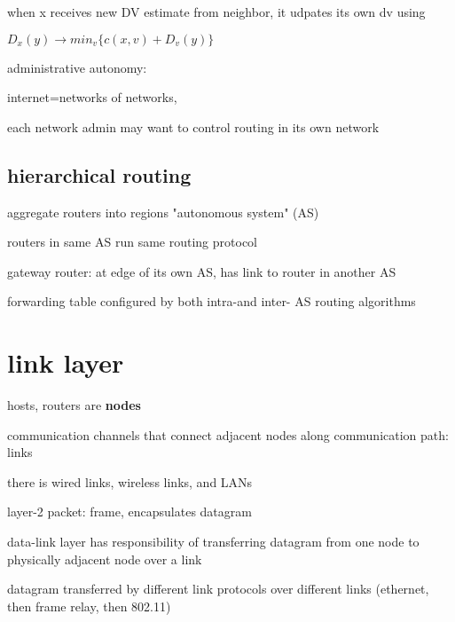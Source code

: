 \documentclass[10pt]{article}
\theoremstyle{break}
\begin{document}
when x receives new DV estimate from neighbor, it udpates its own dv using 

$D_x(y) \rightarrow min_v\{c(x,v)+D_v(y)\}$

administrative autonomy: 

internet=networks of networks,

each network admin may want to control routing in its own network 

\subsection{hierarchical routing}
aggregate routers into regions "autonomous system" (AS)

routers in same AS run same routing protocol 

gateway router: at edge of its own AS, has link to router in another AS

forwarding table configured by both intra-and inter- AS routing algorithms

\section{link layer}
hosts, routers are \textbf{nodes}

communication channels that connect adjacent nodes along communication path: links

there is wired links, wireless links, and LANs 

layer-2 packet: frame, encapsulates datagram

data-link layer has responsibility of transferring datagram from one node to physically adjacent node over a link

datagram transferred by different link protocols over different links (ethernet, then frame relay, then 802.11)
\end{document}
